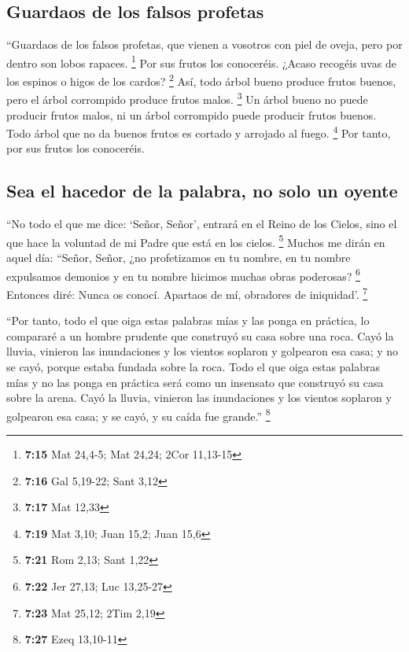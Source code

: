 \hypertarget{guardaos-de-los-falsos-profetas}{%
\subsection{Guardaos de los falsos
profetas}\label{guardaos-de-los-falsos-profetas}}

 ``Guardaos de los falsos profetas, que vienen a vosotros
con piel de oveja, pero por dentro son lobos rapaces. \footnote{\textbf{7:15}
  Mat 24,4-5; Mat 24,24; 2Cor 11,13-15}  Por sus frutos
los conoceréis. ¿Acaso recogéis uvas de los espinos o higos de los
cardos? \footnote{\textbf{7:16} Gal 5,19-22; Sant 3,12} 
Así, todo árbol bueno produce frutos buenos, pero el árbol corrompido
produce frutos malos. \footnote{\textbf{7:17} Mat 12,33} 
Un árbol bueno no puede producir frutos malos, ni un árbol corrompido
puede producir frutos buenos.  Todo árbol que no da
buenos frutos es cortado y arrojado al fuego. \footnote{\textbf{7:19}
  Mat 3,10; Juan 15,2; Juan 15,6}  Por tanto, por sus
frutos los conoceréis.

\hypertarget{sea-el-hacedor-de-la-palabra-no-solo-un-oyente}{%
\subsection{Sea el hacedor de la palabra, no solo un
oyente}\label{sea-el-hacedor-de-la-palabra-no-solo-un-oyente}}

 ``No todo el que me dice: `Señor, Señor', entrará en el
Reino de los Cielos, sino el que hace la voluntad de mi Padre que está
en los cielos. \footnote{\textbf{7:21} Rom 2,13; Sant 1,22}
 Muchos me dirán en aquel día: ``Señor, Señor, ¿no
profetizamos en tu nombre, en tu nombre expulsamos demonios y en tu
nombre hicimos muchas obras poderosas? \footnote{\textbf{7:22} Jer
  27,13; Luc 13,25-27}  Entonces diré: Nunca os conocí.
Apartaos de mí, obradores de iniquidad'. \footnote{\textbf{7:23} Mat
  25,12; 2Tim 2,19}

 ``Por tanto, todo el que oiga estas palabras mías y las
ponga en práctica, lo compararé a un hombre prudente que construyó su
casa sobre una roca.  Cayó la lluvia, vinieron las
inundaciones y los vientos soplaron y golpearon esa casa; y no se cayó,
porque estaba fundada sobre la roca.  Todo el que oiga
estas palabras mías y no las ponga en práctica será como un insensato
que construyó su casa sobre la arena.  Cayó la lluvia,
vinieron las inundaciones y los vientos soplaron y golpearon esa casa; y
se cayó, y su caída fue grande.'' \footnote{\textbf{7:27} Ezeq 13,10-11}

